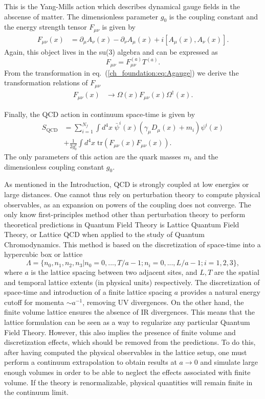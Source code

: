 This is the Yang-Mills action which describes dynamical gauge fields in the abscense of matter. The dimensionless parameter $g_0$ is the coupling constant and the energy strength tensor $F_{\mu\nu}$ is given by
\begin{align}
F_{\mu\nu}(x)&=\partial_{\mu}A_{\nu}(x)-\partial_{\nu}A_{\mu}(x)+i\left[A_{\mu}(x),A_{\nu}(x)\right].
\end{align}
Again, this object lives in the su(3) algebra and can be expressed as
\begin{equation}
F_{\mu\nu}=F_{\mu\nu}^{(a)}T^{(a)}.
\end{equation}
From the transformation in eq.~(\ref{ch_foundation:eq:Agauge}) we derive the transformation relations of $F_{\mu\nu}$
\begin{align}
F_{\mu\nu}(x)&\to\Omega(x)F_{\mu\nu}(x)\Omega^{\dagger}(x).
\end{align}

Finally, the QCD action in continuum space-time is given by 
\begin{align}
\label{ch_foundation:eq:QCD}
S_{\textrm{QCD}}&=\sum_{i=1}^{N_f}\int d^4x\;\bar{\psi}^i(x)\left(\gamma_{\mu}D_{\mu}(x)+m_i\right)\psi^i(x) \\
&+\frac{1}{2g_0^2}\int d^4x\;{\textrm{tr}}\left(F_{\mu\nu}(x)F_{\mu\nu}(x)\right).
\end{align}
The only parameters of this action are the quark masses $m_i$ and the dimensionless coupling constant $g_0$.

As mentioned in the Introduction, QCD is strongly coupled at low energies or large distances. One cannot thus rely on perturbation theory to compute physical observables, as an expansion on powers of the coupling does not converge. The only know first-principles method other than perturbation theory to perform theoretical predictions in Quantum Field Theory is Lattice Quantum Field Theory, or Lattice QCD when applied to the study of Quantum Chromodynamics. This method is based on the discretization of space-time into a hypercubic box or lattice
\begin{equation}
\Lambda=\{n_0,n_1,n_2,n_3|n_0=0,...,T/a-1;n_i=0,...,L/a-1;i=1,2,3\},
\end{equation} 
where $a$ is the lattice spacing between two adjacent sites, and $L,T$ are the spatial and temporal lattice extents (in physical units) respectively. The discretization of space-time and introduction of a finite lattice spacing $a$ provides a natural energy cutoff for momenta $\sim a^{-1}$, removing UV divergences. On the other hand, the finite volume lattice ensures the absence of IR divergences. This means that the lattice formulation can be seen as a way to regularize any particular Quantum Field Theory. However, this also implies the presence of finite volume and discretization effects, which should be removed from the predictions. To do this, after having computed the physical observables in the lattice setup, one must perform a continuum extrapolation to obtain results at $a\rightarrow0$ and simulate large enough volumes in order to be able to neglect the effects associated with finite volume. If the theory is renormalizable, physical quantities will remain finite in the continuum limit.

